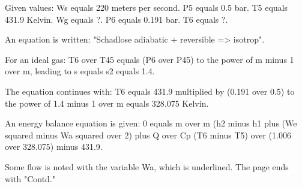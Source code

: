 Given values:
Ws equals 220 meters per second.
P5 equals 0.5 bar.
T5 equals 431.9 Kelvin.
Wg equals ?.
P6 equals 0.191 bar.
T6 equals ?.

An equation is written: "Schadlose adiabatic + reversible => isotrop".

For an ideal gas:
T6 over T45 equals (P6 over P45) to the power of m minus 1 over m, leading to s equals s2 equals 1.4.

The equation continues with:
T6 equals 431.9 multiplied by (0.191 over 0.5) to the power of 1.4 minus 1 over m equals 328.075 Kelvin.

An energy balance equation is given:
0 equals m over m (h2 minus h1 plus (We squared minus Wa squared over 2) plus Q over Cp (T6 minus T5) over (1.006 over 328.075) minus 431.9.

Some flow is noted with the variable Wa, which is underlined. The page ends with "Contd."